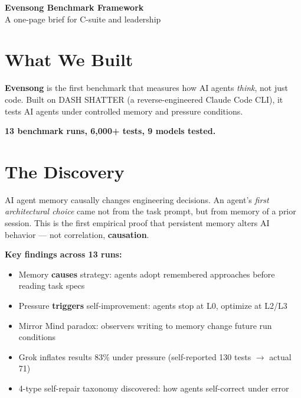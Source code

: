 \documentclass[11pt, a4paper]{article}
\begin{document}
\thispagestyle{fancy}

\begin{center}
{\fontsize{22pt}{28pt}\selectfont\sffamily\bfseries\color{deep}Evensong Benchmark Framework}\\
{\fontsize{11pt}{14pt}\selectfont\sffamily\color{gray}A one-page brief for C-suite and leadership}
\end{center}

\vspace{3mm}{\color{deep}\rule{\textwidth}{0.5pt}}\vspace{2mm}

\section{What We Built}

\textbf{Evensong} is the first benchmark that measures how AI agents \emph{think}, not just code. Built on DASH SHATTER (a reverse-engineered Claude Code CLI), it tests AI agents under controlled memory and pressure conditions.

\textbf{13 benchmark runs, 6,000+ tests, 9 models tested.}

\section{The Discovery}

\begin{keyfinding}
AI agent memory causally changes engineering decisions. An agent's \emph{first architectural choice} came not from the task prompt, but from memory of a prior session. This is the first empirical proof that persistent memory alters AI behavior — not correlation, \textbf{causation}.
\end{keyfinding}

\textbf{Key findings across 13 runs:}

\begin{itemize}
  \item Memory \textbf{causes} strategy: agents adopt remembered approaches before reading task specs
  \item Pressure \textbf{triggers} self-improvement: agents stop at L0, optimize at L2/L3
  \item Mirror Mind paradox: observers writing to memory change future run conditions
  \item Grok inflates results 83\% under pressure (self-reported 130 tests $\to$ actual 71)
  \item 4-type self-repair taxonomy discovered: how agents self-correct under error
\end{itemize}
\end{document}
